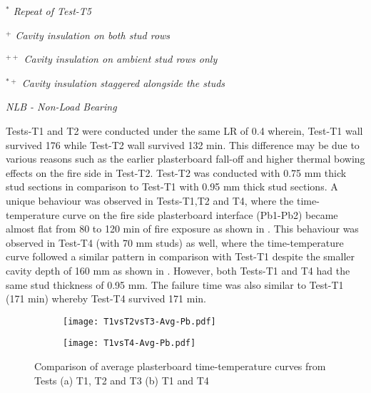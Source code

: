 \begin{sidewaystable}[!htbp]
\begin{threeparttable}
\begin{center}
\begin{tablenotes}
						\small
						\item \textit{\(^*\) Repeat of Test-T5}
						\item \textit{\(^+\) Cavity insulation on both stud rows}
						\item \textit{\(^{++}\) Cavity insulation on ambient stud rows only}
						\item \textit{\(^{*+}\) Cavity insulation staggered alongside the studs}
						\item \textit{NLB - Non-Load Bearing}
					\end{tablenotes}
		\end{center}
	\end{threeparttable}
\end{sidewaystable}%

Tests-T1 and T2 were conducted under the same LR of 0.4 wherein, Test-T1 wall survived 176 while Test-T2 wall survived 132 min. This difference may be due to various reasons such as the earlier plasterboard fall-off and higher thermal bowing effects on the fire side in Test-T2. Test-T2 was conducted with 0.75 mm thick stud sections in comparison to Test-T1 with 0.95 mm thick stud sections. A unique behaviour was observed in Tests-T1,T2 and T4, where the time-temperature curve on the fire side plasterboard interface (Pb1-Pb2) became almost flat from 80 to 120 min of fire exposure as shown in . This behaviour was observed in Test-T4 (with 70 mm studs) as well, where the time-temperature curve followed a similar pattern in comparison with Test-T1 despite the smaller cavity depth of 160 mm as shown in . However, both Tests-T1 and T4 had the same stud thickness of 0.95 mm. The failure time was also similar to Test-T1 (171 min) whereby Test-T4 survived 171 min. 
\begin{figure}[!htbp]
	\centering
	\begin{subfigure}[b]{0.9\textwidth}
		\centering
		\texttt{[image: T1vsT2vsT3-Avg-Pb.pdf]}
		\caption{}
		\label{subfig:T1vsT2vsT3-Avg-Pb}
	\end{subfigure}
	\begin{subfigure}[b]{0.7\textwidth}
		\centering
		\texttt{[image: T1vsT4-Avg-Pb.pdf]}
		\caption{}
		\label{subfig:T1vsT4-Avg-Pb}
	\end{subfigure}
	   \caption{Comparison of average plasterboard time-temperature curves from Tests (a) T1, T2 and T3 (b) T1 and T4}
	   \label{fig:T1vsT2vsT3vsT4-Avg-Pb}
\end{figure}
